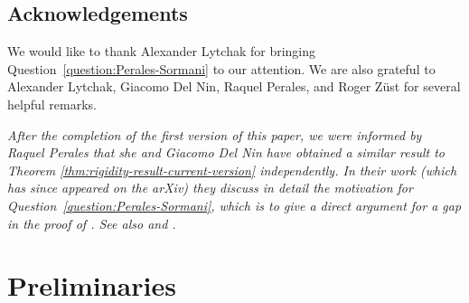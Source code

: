 \documentclass[reqno]{amsart}
\numberwithin{equation}{section}
\begin{document}
\subsection{Acknowledgements} We would like to thank Alexander Lytchak for bringing Question~\ref{question:Perales-Sormani} to our attention. We are also grateful to Alexander Lytchak, Giacomo Del Nin, Raquel Perales, and Roger Züst for several helpful remarks.

\bigskip

\emph{
After the completion of the first version of this paper, we were informed by Raquel Perales that she and Giacomo Del Nin have obtained a similar result to Theorem \ref{thm:rigidity-result-current-version} independently. In their work \cite{Upcoming} (which has since appeared on the arXiv) they discuss in detail the motivation for Question~\ref{question:Perales-Sormani}, which is to give a direct argument for a gap in the proof of \cite[Theorem 1.3]{sormani-2017}.  See also \cite{sormani-corrigendum-2022} and \cite{allen2020intrinsic, allen2020volume,HLP20}.}


\section{Preliminaries}\label{sec:2}
\end{document}
